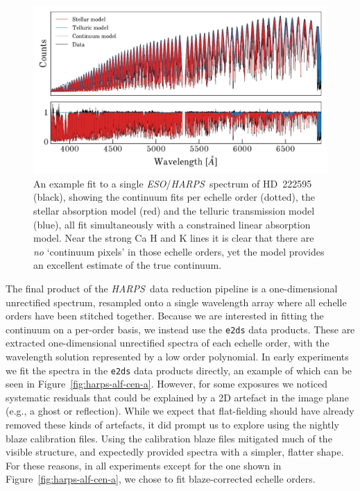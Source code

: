 \documentclass[modern]{aastex631}
\newcommand{\project}[1]{\textit{#1}}
\newcommand{\eso}{\project{ESO}}
\newcommand{\harps}{\project{HARPS}}
\begin{document}
\begin{figure}
    \includegraphics[width=\textwidth]{example.pdf}
    \caption{An example fit to a single \eso/\harps\ spectrum of HD~222595 (black), showing the continuum fits per echelle order (dotted), the stellar absorption model (red) and the telluric transmission model (blue), all fit simultaneously with a constrained linear absorption model. Near the strong Ca H and K lines it is clear that there are \emph{no} `continuum pixels' in those echelle orders, yet the model provides an excellent estimate of the true continuum. \label{fig:example-echelle}}
\end{figure}

The final product of the \harps\ data reduction pipeline is a one-dimensional unrectified spectrum, resampled onto a single wavelength array where all echelle orders have been stitched together. Because we are interested in fitting the continuum on a per-order basis, we instead use the \texttt{e2ds} data products. These are extracted one-dimensional unrectified spectra of each echelle order, with the wavelength solution represented by a low order polynomial. In early experiments we fit the spectra in the \texttt{e2ds} data products directly, an example of which can be seen in Figure~\ref{fig:harps-alf-cen-a}. However, for some exposures we noticed systematic residuals that could be explained by a 2D artefact in the image plane (e.g., a ghost or reflection). While we expect that flat-fielding should have already removed these kinds of artefacts, it did prompt us to explore using the nightly blaze calibration files. Using the calibration blaze files mitigated much of the visible structure, and expectedly provided spectra with a simpler, flatter shape. For these reasons, in all experiments except for the one shown in Figure~\ref{fig:harps-alf-cen-a}, we chose to fit blaze-corrected echelle orders.\\
\end{document}
